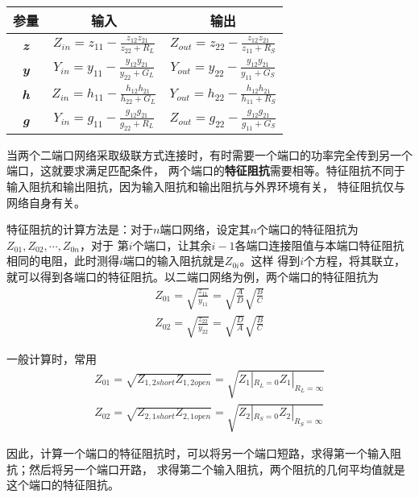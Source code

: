     \begin{center}
        \begin{tabular}{|c|c|c|}
            \hline
            \bfseries 参量 & \bfseries 输入 & \bfseries 输出 \\
            \hline
            \textbf{\textit{z}} &
            \(
            Z_{in}=z_{11}-\frac{z_{12}z_{21}}{z_{22}+R_L}    
            \) &
            \(
            Z_{out}=z_{22}-\frac{z_{12}z_{21}}{z_{11}+R_S}    
            \) \\
            \hline
            \textbf{\textit{y}} &
            \(
            Y_{in}=y_{11}-\frac{y_{12}y_{21}}{y_{22}+G_L}    
            \) &
            \(
            Y_{out}=y_{22}-\frac{y_{12}y_{21}}{y_{11}+G_S}    
            \) \\
            \hline
            \textbf{\textit{h}} &
            \(
            Z_{in}=h_{11}-\frac{h_{12}h_{21}}{h_{22}+G_L}    
            \) &
            \(
            Y_{out}=h_{22}-\frac{h_{12}h_{21}}{h_{11}+R_S}    
            \) \\
            \hline
            \textbf{\textit{g}} &
            \(
            Y_{in}=g_{11}-\frac{g_{12}g_{21}}{g_{22}+R_L}    
            \) &
            \(
            Z_{out}=g_{22}-\frac{g_{12}g_{21}}{g_{11}+G_S}    
            \) \\
            \hline
        \end{tabular}
    \end{center}
    \par 当两个二端口网络采取级联方式连接时，有时需要一个端口的功率完全传到另一个端口，这就要求满足匹配条件，
    两个端口的\textbf{特征阻抗}需要相等。特征阻抗不同于输入阻抗和输出阻抗，因为输入阻抗和输出阻抗与外界环境有关，
    特征阻抗仅与网络自身有关。
    \par 特征阻抗的计算方法是：对于$n$端口网络，设定其$n$个端口的特征阻抗为$Z_{01},Z_{02},\cdots,Z_{0n}$，对于
    第$i$个端口，让其余$i-1$各端口连接阻值与本端口特征阻抗相同的电阻，此时测得$i$端口的输入阻抗就是$Z_{0i}$。这样
    得到$i$个方程，将其联立，就可以得到各端口的特征阻抗。以二端口网络为例，两个端口的特征阻抗为
    \begin{align*}
        Z_{01}=\sqrt{\frac{z_{11}}{y_{11}}}=\sqrt{\frac{A}{D}}\sqrt{\frac{B}{C}}\\
        Z_{02}=\sqrt{\frac{z_{22}}{y_{22}}}=\sqrt{\frac{D}{A}}\sqrt{\frac{B}{C}}
    \end{align*}
    \par 一般计算时，常用
    \begin{align*}
        Z_{01}=\sqrt{Z_{1,2short}Z_{1,2open}}=\sqrt{Z_1|_{R_L=0}Z_1|_{R_L=\infty}}\\
        Z_{02}=\sqrt{Z_{2,1short}Z_{2,1open}}=\sqrt{Z_2|_{R_S=0}Z_2|_{R_S=\infty}}
    \end{align*}
    \par 因此，计算一个端口的特征阻抗时，可以将另一个端口短路，求得第一个输入阻抗；然后将另一个端口开路，
    求得第二个输入阻抗，两个阻抗的几何平均值就是这个端口的特征阻抗。
